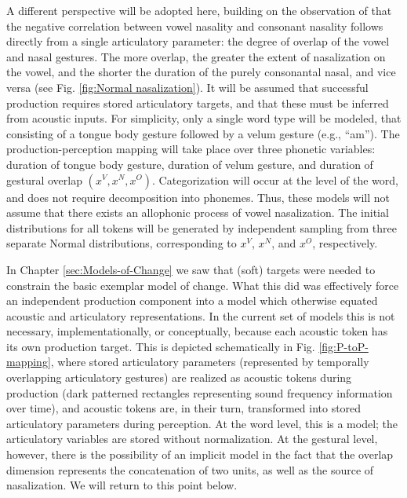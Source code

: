 A different perspective will be adopted here, building on the observation
of \citet{Beddor2009} that the negative correlation between vowel
nasality and consonant nasality follows directly from a single articulatory
parameter: the degree of overlap of the vowel and nasal gestures.
The more overlap, the greater the extent of nasalization on the vowel,
and the shorter the duration of the purely consonantal nasal, and
vice versa (see Fig. \ref{fig:Normal nasalization}). It will be assumed
that successful production requires stored articulatory targets, and
that these must be inferred from acoustic inputs. For simplicity,
only a single word type will be modeled, that consisting of a tongue
body gesture followed by a velum gesture (e.g., “am”). The production-perception
mapping will take place over three phonetic variables: duration of
tongue body gesture, duration of velum gesture, and duration of gestural
overlap $(x^{V},x^{N},x^{O})$. Categorization will occur at the level
of the word, and does not require decomposition into phonemes. Thus,
these models will not assume that there exists an allophonic process
of vowel nasalization. The initial distributions for all tokens will
be generated by independent sampling from three separate Normal distributions,
corresponding to $x^{V}$, $x^{N}$, and $x^{O}$, respectively. 

In Chapter \ref{sec:Models-of-Change} we saw that (soft) targets
were needed to constrain the basic exemplar model of change. What
this did was effectively force an independent production component
into a model which otherwise equated acoustic and articulatory representations.
In the current set of models this is not necessary, implementationally,
or conceptually, because each acoustic token has its own production
target. This is depicted schematically in Fig. \ref{fig:P-toP-mapping},
where stored articulatory parameters (represented by temporally overlapping
articulatory gestures) are realized as acoustic tokens during production
(dark patterned rectangles representing sound frequency information
over time), and acoustic tokens are, in their turn, transformed into
stored articulatory parameters during perception. At the word level,
this is a  model; the articulatory variables are stored
without normalization. At the gestural level, however, there is the
possibility of an implicit  model in the fact that the
overlap dimension represents the concatenation of two units, as well
as the source of nasalization. We will return to this point below.

